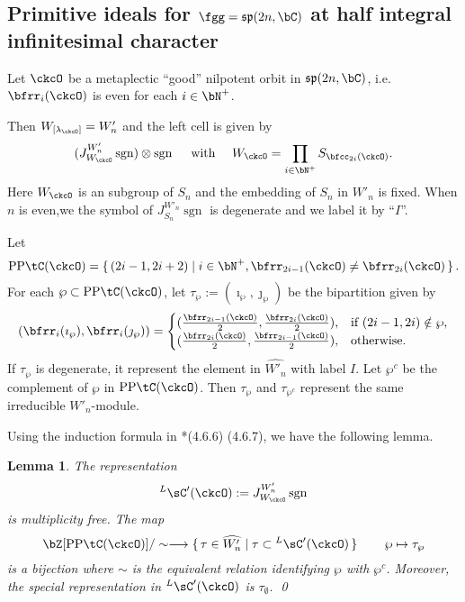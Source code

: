 \documentclass[12pt,a4paper]{amsart}
\def\fsp{\mathfrak{sp}}
\newcommand{\sgn}{\operatorname{sgn}}
\numberwithin{equation}{section}
\newtheorem{lem}[thm]{Lemma}
\theoremstyle{remark}
\def\PP{\mathrm{PP}}
\begin{document}
\subsection{Primitive ideals for $\fgg=\fsp(2n,\bC)$ at half integral infinitesimal character}

Let $\ckcO$ be a metaplectic ``good'' nilpotent orbit in $\fsp(2n,\bC)$, i.e.
$\bfrr_i(\ckcO)$ is even for each $i\in \bN^+$.

Then $W_{[\lambda_{\ckcO}]} = W'_n$ and the left cell is given by
\[
(J_{W_\ckcO}^{W'_n} \sgn) \otimes \sgn \quad \text{ with } \quad W_\ckcO = \prod_{i\in \bN^+} S_{\bfcc_{2i}(\ckcO)}.
\]
Here $W_\ckcO$ is an subgroup of $S_n$ and the embedding of $S_n$ in $W'_n$ is fixed.
When $n$ is even,we the symbol of $J_{S_n}^{W'_n} \sgn$ is degenerate and we label it by ``$I$''.

\def\PPtC{\PP{\tC}}
 Let
 \[
  \PPtC(\ckcO) = \set{(2i-1,2i+2)|i\in \bN^+, \bfrr_{2i-1}(\ckcO)\neq \bfrr_{2i}(\ckcO)}.
 \]
  For each $\wp\subset \PPtC(\ckcO)$, let $\tau_\wp := (\imath_\wp,\jmath_\wp)$ be the bipartition
  given by
  \[
    (\bfrr_i(\imath_\wp),\bfrr_i(\jmath_\wp)) =\begin{cases}
      (\frac{\bfrr_{2i-1}(\ckcO)}{2}, \frac{\bfrr_{2i}(\ckcO)}{2}),   & \text{if } (2i-1,2i)\notin \wp, \\
      (\frac{\bfrr_{2i}(\ckcO)}{2}, \frac{\bfrr_{2i-1}(\ckcO)}{2}), & \text{otherwise.}
    \end{cases}
  \]
  If $\tau_\wp$ is degenerate, it represent the element in $\widehat{W'_n}$
  with label $I$.
  Let $\wp^c$ be the complement of $\wp$ in $\PPtC(\ckcO)$.
  Then $\tau_\wp$ and $\tau_{\wp^c}$ represent the same irreducible $W'_n$-module.

  \def\LCC{{}^L\sC'}
Using the induction formula in \cite{L}*{(4.6.6) (4.6.7)}, we have the following lemma.
\begin{lem}
The representation
\[
  \LCC(\ckcO) :=J_{W_\ckcO}^{W'_n} \sgn
\]
is multiplicity free.
The map
\[
  \bZ[\PPtC(\ckcO)]/\sim \longrightarrow \set{\tau\in \widehat{W'_n}| \tau\subset \LCC(\ckcO)}
  \qquad \wp \mapsto \tau_\wp
\]
is a bijection where $\sim$ is the equivalent relation identifying $\wp$ with $\wp^c$.
Moreover, the special representation in $\LCC(\ckcO)$ is $\tau_\emptyset$.
\qed
\end{lem}
\end{document}
